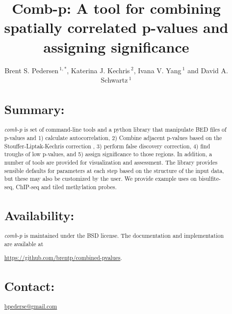 \documentclass{bioinfo}
\begin{document}

\title[comb-p]{Comb-p: A tool for combining spatially correlated p-values and assigning significance}
\author[Pedersen \textit{et~al}]{Brent S. Pedersen\,$^{1,*}$, Katerina J. Kechris\,$^{2}$,
    Ivana V. Yang\,$^{1}$ and David A. Schwartz\,$^1$}
\address{$^{1}$Department of Medicine, University of Colorado, Denver, Anschutz Medical Campus, Aurora CO 80045, USA\\
$^{2}$Department of Statistics, University of Colorado, Denver, Anschutz Medical Campus, Aurora CO 80045, USA\\
}
\maketitle
\begin{abstract}

\section{Summary:}
\textit{comb-p} is set of command-line tools and a python library that
manipulate BED files of p-values and 1) calculate autocorrelation, 2) Combine
adjacent p-values based on the Stouffer-Liptak-Kechris correction \citep{Kechris2010},
3) perform false discovery correction, 4) find troughs of low p-values, and 5)
assign significance to those regions.
In addition, a number of tools are provided for visualization and
assessment. The library provides sensible defaults for parameters at each
step based on the structure of the input data, but these may also be customized
by the user. We provide example uses on bisulfite-seq, ChIP-seq and tiled methylation
probes.

\section{Availability:}
 \textit{comb-p} is maintained under the BSD license. The documentation and
 implementation are available at

 \href{https://github.com/brentp/combined-pvalues}{https://github.com/brentp/combined-pvalues}.
\section{Contact:} \href{bpederse@gmail.com}{bpederse@gmail.com}
\end{abstract}
\end{document}
